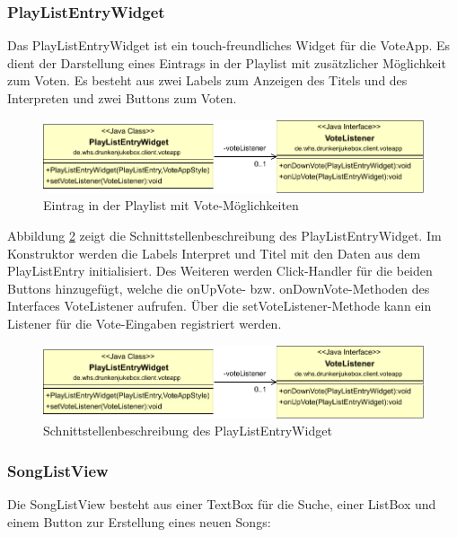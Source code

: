 \subsubsection{PlayListEntryWidget}
Das PlayListEntryWidget ist ein touch-freundliches Widget für die VoteApp. Es dient der Darstellung eines Eintrags in der Playlist mit zusätzlicher Möglichkeit zum Voten. Es besteht aus zwei Labels zum Anzeigen des Titels und des Interpreten und zwei Buttons zum Voten. 

\begin{figure}[tbh]
	\centering
	\includegraphics[width=0.7\linewidth]{Bilder/PlayListEntry}
	\caption{Eintrag in der Playlist mit Vote-Möglichkeiten}
	\label{fig:PlayListEntry}
\end{figure}

Abbildung \ref{fig:PlayListEntryClass} zeigt die Schnittstellenbeschreibung des PlayListEntryWidget. Im Konstruktor werden die Labels Interpret und Titel mit den Daten aus dem PlayListEntry initialisiert. Des Weiteren werden Click-Handler für die beiden Buttons hinzugefügt, welche die onUpVote- bzw. onDownVote-Methoden des Interfaces VoteListener aufrufen. Über die setVoteListener-Methode kann ein Listener für die Vote-Eingaben registriert werden.

\begin{figure}[tbh]
	\centering
	\includegraphics[width=1.0\linewidth]{Bilder/PlayListEntry.pdf}
	\caption{Schnittstellenbeschreibung des PlayListEntryWidget}
	\label{fig:PlayListEntryClass}
\end{figure}


\subsubsection{SongListView}
Die SongListView besteht aus einer TextBox für die Suche, einer ListBox und einem Button zur Erstellung eines neuen Songs:

